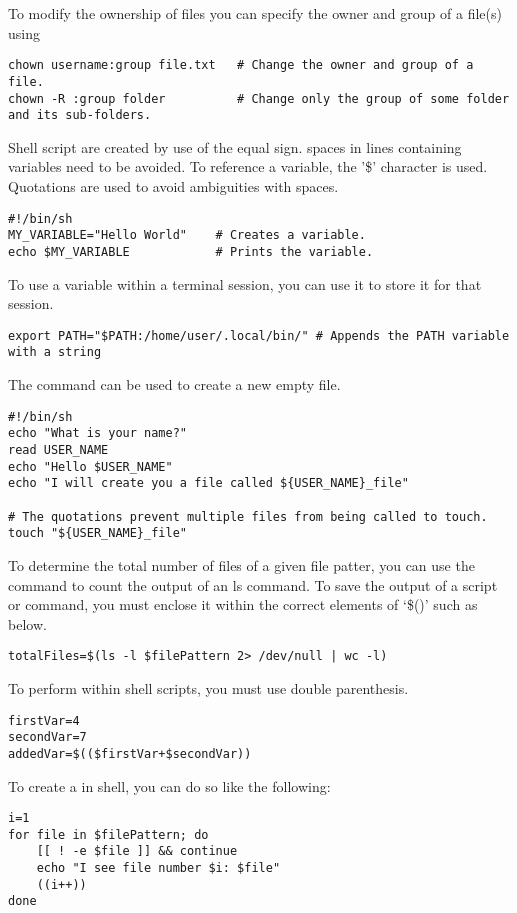 To modify the ownership of files you can specify the owner and group of a file(s) using 
\begin{lstlisting}
chown username:group file.txt   # Change the owner and group of a file.
chown -R :group folder          # Change only the group of some folder and its sub-folders.         
\end{lstlisting}

Shell script  are created by use of the equal sign. spaces in lines containing variables need to be avoided. To reference a variable, the '\$' character is used. Quotations are used to avoid ambiguities with spaces.
\begin{lstlisting}
#!/bin/sh
MY_VARIABLE="Hello World"    # Creates a variable.
echo $MY_VARIABLE            # Prints the variable.
\end{lstlisting}

To use a variable within a terminal session, you can use  it to store it for that session.
\begin{lstlisting}
export PATH="$PATH:/home/user/.local/bin/" # Appends the PATH variable with a string
\end{lstlisting}

The  command can be used to create a new empty file.
\begin{lstlisting}
#!/bin/sh
echo "What is your name?"
read USER_NAME
echo "Hello $USER_NAME"
echo "I will create you a file called ${USER_NAME}_file"

# The quotations prevent multiple files from being called to touch.
touch "${USER_NAME}_file"
\end{lstlisting}

To determine the total number of files of a given file patter, you can use the  command to count the output of an ls command. To save the output of a script or command, you must enclose it within the correct elements of `\$()' such as below.
\begin{lstlisting}
totalFiles=$(ls -l $filePattern 2> /dev/null | wc -l)
\end{lstlisting}

To perform  within shell scripts, you must use double parenthesis.
\begin{lstlisting}
firstVar=4
secondVar=7
addedVar=$(($firstVar+$secondVar))
\end{lstlisting}

To create a  in shell, you can do so like the following:
\begin{lstlisting}
i=1
for file in $filePattern; do
	[[ ! -e $file ]] && continue
	echo "I see file number $i: $file"
	((i++))
done
\end{lstlisting}







